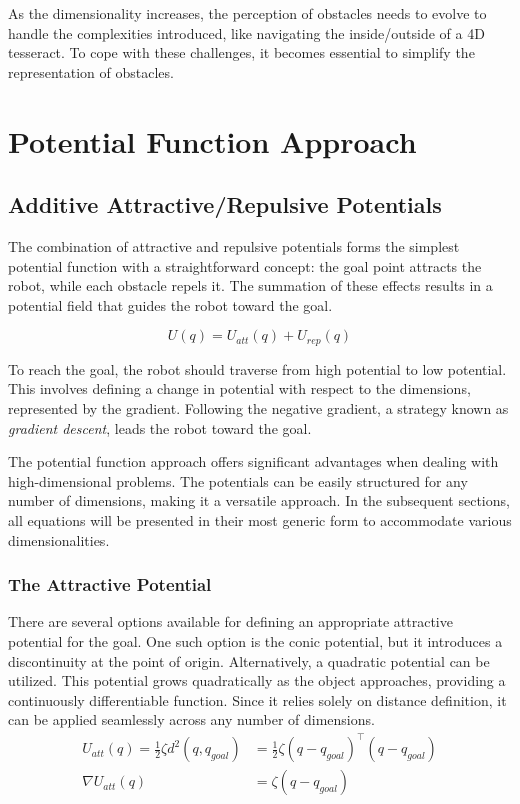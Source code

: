 \documentclass{IEEEtaes}
\begin{document}
{As the dimensionality increases, the perception of obstacles needs to evolve to handle the complexities introduced, like navigating the inside/outside of a 4D tesseract. To cope with these challenges, it becomes essential to simplify the representation of obstacles.




\section{\large \textbf{Potential Function Approach}}

\subsection{Additive Attractive/Repulsive Potentials}
The combination of attractive and repulsive potentials forms the simplest potential function with a straightforward concept: the goal point attracts the robot, while each obstacle repels it. The summation of these effects results in a potential field that guides the robot toward the goal.

\begin{equation*}
    U(q) = U_{att}(q)+ U_{rep}(q)
\end{equation*}

To reach the goal, the robot should traverse from high potential to low potential. This involves defining a change in potential with respect to the dimensions, represented by the gradient. Following the negative gradient, a strategy known as \textit{gradient descent}, leads the robot toward the goal.

The potential function approach offers significant advantages when dealing with high-dimensional problems. The potentials can be easily structured for any number of dimensions, making it a versatile approach. In the subsequent sections, all equations will be presented in their most generic form to accommodate various dimensionalities.
    

\subsubsection{The Attractive Potential}
There are several options available for defining an appropriate attractive potential for the goal. One such option is the conic potential, but it introduces a discontinuity at the point of origin. Alternatively, a quadratic potential can be utilized. This potential grows quadratically as the object approaches, providing a continuously differentiable function. Since it relies solely on distance definition, it can be applied seamlessly across any number of dimensions.
\begin{equation*}
\begin{split}
    U_{att}(q) = \frac{1}{2}\zeta d^2(q,q_{goal}) &= \frac{1}{2} \zeta (q-q_{goal})^\top(q-q_{goal}) \\
    \nabla U_{att}(q) &= \zeta (q-q_{goal})   
\end{split}
\end{equation*}

}
\end{document}
